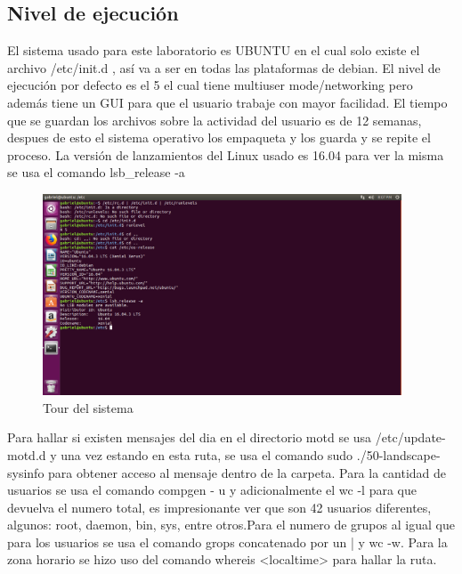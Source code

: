 \documentclass[
  letterpaper, 
  maincolor=black,
  sectioncolor=black!90,
  subsectioncolor=black!70,
  itemtextcolor=black!40,
]{fortysecondscv}
\begin{document}
        \subsection{Nivel de ejecución}
            El sistema usado para este laboratorio es UBUNTU en el cual solo existe el archivo /etc/init.d , así va a ser en todas las plataformas de debian. El nivel de ejecución por defecto es el 5 el cual tiene multiuser mode/networking pero además tiene un GUI para que el usuario trabaje con mayor facilidad. El tiempo que se guardan los archivos sobre la actividad del usuario es de 12 semanas, despues de esto el sistema operativo los empaqueta y los guarda y se repite el proceso. La versión de lanzamientos del Linux usado es 16.04 para ver la misma se usa el comando lsb\_release -a
            \begin{figure}[H]
            \centering
            \includegraphics[trim= 0 220 580 0,clip,width=0.95\textwidth]{img/tour.jpg}
            \caption{Tour del sistema}
            \label{fig:my_label}
            \end{figure}
            Para hallar si existen mensajes del dia en el directorio motd se usa /etc/update-motd.d y una vez estando en esta ruta, se usa el comando sudo ./50-landscape-sysinfo para obtener acceso al mensaje dentro de la carpeta. 
            Para la cantidad de usuarios se usa el comando compgen - u y adicionalmente el wc -l para que devuelva el numero total, es impresionante ver que son 42 usuarios diferentes, algunos: root, daemon, bin, sys, entre otros.Para el numero de grupos al igual que para los usuarios se usa el comando grops concatenado por un | y wc -w.
            Para la zona horario se hizo uso del comando whereis <localtime> para hallar la ruta.
\end{document}
